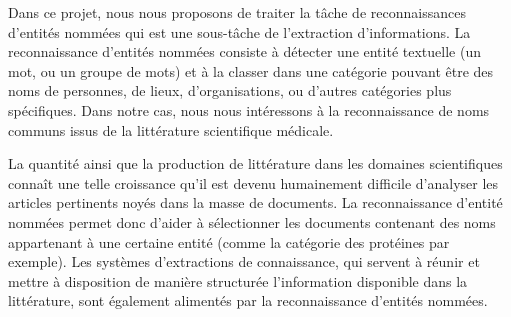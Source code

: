 Dans ce projet, nous nous proposons de traiter la tâche de reconnaissances d’entités nommées qui est une sous-tâche de l’extraction d’informations. La reconnaissance d’entités nommées consiste à détecter une entité textuelle (un mot, ou un groupe de mots) et à la classer dans une catégorie pouvant être des noms de personnes, de lieux, d’organisations, ou d’autres catégories plus spécifiques. Dans notre cas, nous nous intéressons à la reconnaissance de noms communs issus de la littérature scientifique médicale. 

La quantité ainsi que la production de littérature dans les domaines scientifiques connaît une telle croissance qu’il est devenu humainement difficile d’analyser les articles pertinents noyés dans la masse de documents. La reconnaissance d'entité nommées permet donc d'aider à sélectionner les documents contenant des noms appartenant à une certaine entité (comme la catégorie des protéines par exemple). Les systèmes d'extractions de connaissance, qui servent à réunir et mettre à disposition de manière structurée l'information disponible dans la littérature, sont également alimentés par la reconnaissance d'entités nommées.